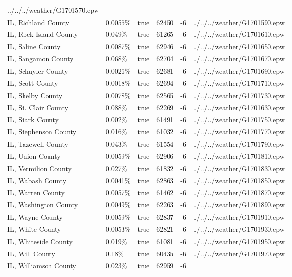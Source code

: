 \begin{longtable}[]{@{}llllll@{}}
../../../weather/G1701570.epw \\
IL, Richland County & 0.0056\% & true & 62450 & -6 &
../../../weather/G1701590.epw \\
IL, Rock Island County & 0.049\% & true & 61265 & -6 &
../../../weather/G1701610.epw \\
IL, Saline County & 0.0087\% & true & 62946 & -6 &
../../../weather/G1701650.epw \\
IL, Sangamon County & 0.068\% & true & 62704 & -6 &
../../../weather/G1701670.epw \\
IL, Schuyler County & 0.0026\% & true & 62681 & -6 &
../../../weather/G1701690.epw \\
IL, Scott County & 0.0018\% & true & 62694 & -6 &
../../../weather/G1701710.epw \\
IL, Shelby County & 0.0078\% & true & 62565 & -6 &
../../../weather/G1701730.epw \\
IL, St. Clair County & 0.088\% & true & 62269 & -6 &
../../../weather/G1701630.epw \\
IL, Stark County & 0.002\% & true & 61491 & -6 &
../../../weather/G1701750.epw \\
IL, Stephenson County & 0.016\% & true & 61032 & -6 &
../../../weather/G1701770.epw \\
IL, Tazewell County & 0.043\% & true & 61554 & -6 &
../../../weather/G1701790.epw \\
IL, Union County & 0.0059\% & true & 62906 & -6 &
../../../weather/G1701810.epw \\
IL, Vermilion County & 0.027\% & true & 61832 & -6 &
../../../weather/G1701830.epw \\
IL, Wabash County & 0.0041\% & true & 62863 & -6 &
../../../weather/G1701850.epw \\
IL, Warren County & 0.0057\% & true & 61462 & -6 &
../../../weather/G1701870.epw \\
IL, Washington County & 0.0049\% & true & 62263 & -6 &
../../../weather/G1701890.epw \\
IL, Wayne County & 0.0059\% & true & 62837 & -6 &
../../../weather/G1701910.epw \\
IL, White County & 0.0053\% & true & 62821 & -6 &
../../../weather/G1701930.epw \\
IL, Whiteside County & 0.019\% & true & 61081 & -6 &
../../../weather/G1701950.epw \\
IL, Will County & 0.18\% & true & 60435 & -6 &
../../../weather/G1701970.epw \\
IL, Williamson County & 0.023\% & true & 62959 & -6 &

\end{longtable}
